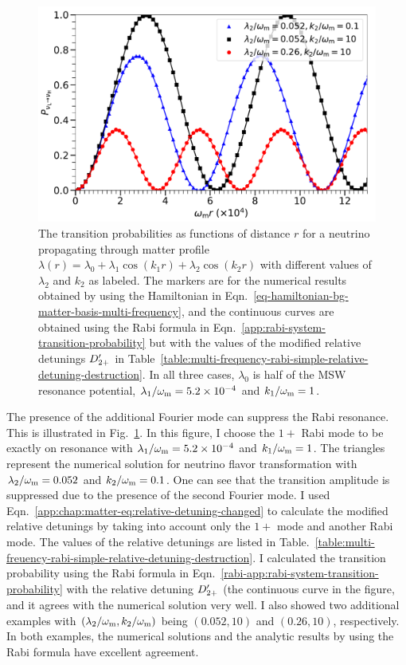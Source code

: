 \begin{figure}[!htbp]
    \centering
    \includegraphics[width=\columnwidth]{chapters/assets/matter/interference-reduction-slide-with-legend}
    \caption{The transition probabilities as functions of distance $r$ for a neutrino propagating through matter profile $\lambda(r) = \lambda_0 + \lambda_1 \cos (k_1 r) + \lambda_2 \cos (k_2 r)$ with different values of $\lambda_2$ and $k_2$ as labeled. The markers are for the numerical results obtained by using the Hamiltonian in Eqn.~\ref{eq-hamiltonian-bg-matter-basis-multi-frequency}, and the continuous curves are obtained using the Rabi formula in Eqn.~\ref{app:rabi-system-transition-probability} but with the values of the modified relative detunings $D'_{2+}$ in Table~\ref{table:multi-frequency-rabi-simple-relative-detuning-destruction}. In all three cases, $\lambda_0$ is half of the MSW resonance potential, $\lambda_1/\omega_\mathrm m = 5.2\times 10^{-4}$ and $k_1/\omega_\mathrm m = 1$.}
    \label{fig-rabi-oscillations-energy-gap-change}
\end{figure}

The presence of the additional Fourier mode can suppress the Rabi resonance. This is illustrated in Fig.~\ref{fig-rabi-oscillations-energy-gap-change}. In this figure, I choose the $1+$ Rabi mode to be exactly on resonance with $\lambda_1/\omega_\mathrm m=5.2\times 10^{-4}$ and $k_1/\omega_\mathrm m=1$. The triangles represent the numerical solution for neutrino flavor transformation with $\lambda_2/\omega_\mathrm m=0.052$ and $k_2/\omega_\mathrm m=0.1$. One can see that the transition amplitude is suppressed due to the presence of the second Fourier mode. I used Eqn.~\ref{app:chap:matter-eq:relative-detuning-changed} to calculate the modified relative detunings by taking into account only the $1+$ mode and another Rabi mode. The values of the relative detunings are listed in Table.~\ref{table:multi-freuency-rabi-simple-relative-detuning-destruction}. I calculated the transition probability using the Rabi formula in Eqn.~\ref{rabi-app:rabi-system-transition-probability} with the relative detuning $D'_{2+}$ (the continuous curve in the figure, and it agrees with the numerical solution very well. I also showed two additional examples with $(\lambda_2/\omega_\mathrm m, k_2/\omega_\mathrm m)$ being $(0.052, 10)$ and $(0.26, 10)$, respectively. In both examples, the numerical solutions and the analytic results by using the Rabi formula have excellent agreement.

